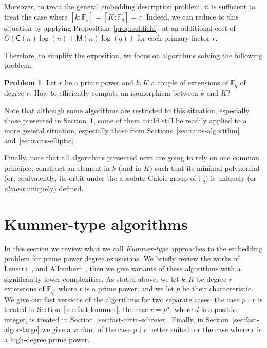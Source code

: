 \documentclass[12pt]{article}
\theoremstyle{plain}
\theoremstyle{definition}
\newtheorem*{problem}{Problem}
\def\F{\ensuremath{\mathbb{F}}}
\def\MM{\ensuremath{\mathsf{M}}}
\def\CC{\ensuremath{\mathsf{C}}}
\newcounter{algorithm}
\begin{document}
Moreover, to treat the general embedding description problem,
it is sufficient to treat the case where $[k:\F_q]=[K:\F_q]=r$.
Indeed, we can reduce to this situation by applying
Proposition~\ref{prop:subfield}, at an additional cost of
$O(\CC(n)\log(n) + \MM(n)\log(q))$ for each primary factor $r$.

Therefore, to simplify the exposition, we focus on algorithms
solving the following problem.
\begin{problem}
\label{prob:embedding}
Let $r$ be a prime power and $k, K$ a couple of extensions of $\F_q$
of degree $r$.
How to efficiently compute an isomorphism between $k$ and $K$?
\end{problem}
Note that although some algorithms are restricted to this situation,
especially those presented in Section~\ref{sec:kummer},
some of them could still be readily applied to a more general situation,
especially those from Sections~\ref{sec:rains-algorithm}
and~\ref{sec:rains-elliptic}.

Finally, note that
all algorithms presented next are going to rely on one common
principle: construct an element in $k$ (and in $K$) such that its
minimal polynomial (or, equivalently, its orbit under the absolute
Galois group of $\F_q$) is uniquely (or \emph{almost} uniquely)
defined.






\section{Kummer-type algorithms}
\label{sec:kummer}

In this section we review what we call \emph{Kummer-type} approaches to the embedding problem for prime power degree extensions. 
We briefly review the works of Lenstra~\cite{LenstraJr91},
and Allombert~\cite{Allombert02,Allombert02-rev}, then 
we give variants of these algorithms with a significantly lower complexities.
As stated above, we let $k, K$ be degree $r$ extensions of $\F_q$,
where $r$ is a prime power,
and we let $p$ be their characteristic.
We give our fast versions of the algorithms for two separate cases: the case $p \nmid r$
is treated in Section~\ref{sec:fast-kummer}, the case $r = p^d$, where $d$ 
is a positive integer, is treated in Section~\ref{sec:fast-artin-schreier}.
Finally, in Section~\ref{sec:fast-algor-large} we give a variant of the case
$p \nmid r$ better suited for the case where $r$ is a high-degree prime power.
\end{document}
